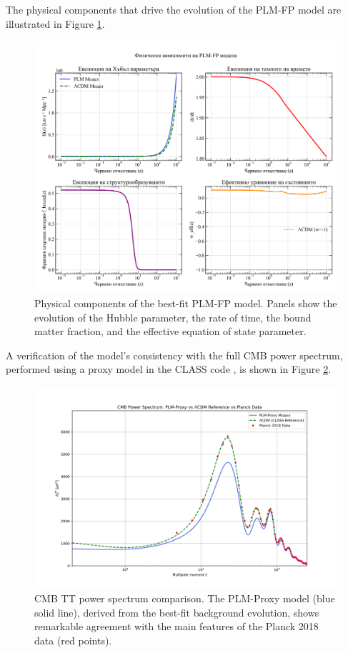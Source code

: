 \documentclass[12pt, a4paper]{article}
\begin{document}
The physical components that drive the evolution of the PLM-FP model are illustrated in Figure \ref{fig:model_physics}.

\begin{figure}[H]
    \centering
    \includegraphics[width=\textwidth]{figure1_model_physics.png}
    \caption{Physical components of the best-fit PLM-FP model. Panels show the evolution of the Hubble parameter, the rate of time, the bound matter fraction, and the effective equation of state parameter.}
    \label{fig:model_physics}
\end{figure}

A verification of the model's consistency with the full CMB power spectrum, performed using a proxy model in the CLASS code \cite{CLASS}, is shown in Figure \ref{fig:cmb_spectrum}.

\begin{figure}[H]
    \centering
    \includegraphics[width=\textwidth]{cmb_spectrum_final_comparison.png}
    \caption{CMB TT power spectrum comparison. The PLM-Proxy model (blue solid line), derived from the best-fit background evolution, shows remarkable agreement with the main features of the Planck 2018 data (red points).}
    \label{fig:cmb_spectrum}
\end{figure}
\end{document}
